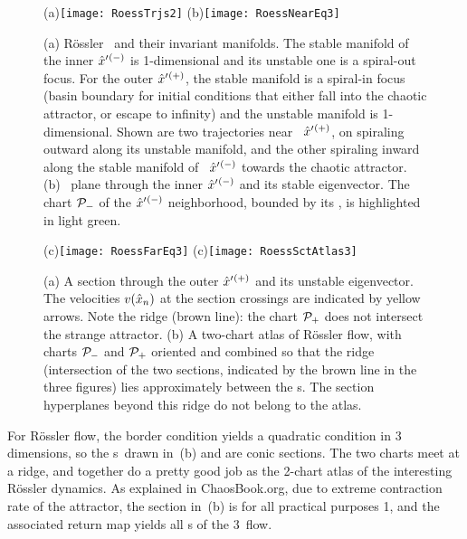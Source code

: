 \documentclass[aip,cha,reprint,
secnumarabic,
nofootinbib, tightenlines,
nobibnotes, showkeys, showpacs,
groupedaddress
]{revtex4-1}
\begin{document}
\begin{figure}
(a)\texttt{[image: RoessTrjs2]}%
(b)\texttt{[image: RoessNearEq3]}
    \caption{
(a)
R\"ossler \eqva\ and their invariant manifolds. The stable manifold of
the inner {\eqv} ${\hat{x}'}{}^{(-)}$  is 1-dimensional and its unstable one
is a spiral-out focus. For the outer {\eqv} ${\hat{x}'}{}^{(+)}$,  the stable
manifold is a spiral-in focus (basin boundary for initial conditions that
either fall into the chaotic attractor, or escape to infinity) and the
unstable manifold is 1-dimensional. Shown are two trajectories near
\eqv\ ${\hat{x}'}{}^{(+)}$, on spiraling outward along its unstable
manifold, and the other spiraling inward along the stable manifold of
\eqv\ ${\hat{x}'}{}^{(-)}$ towards the chaotic attractor.
(b)
\PoincSec\ plane through the inner {\eqv} ${\hat{x}'}{}^{(-)}$ and
its stable eigenvector. The chart ${\cal P}_{-}$ of the ${\hat{x}'}{}^{(-)}$
neighborhood, bounded by its \poincBord, is highlighted in light green.
    }
\label{fig:RoessTrjs}
\end{figure}

\begin{figure}%
\begin{center}
(c)\texttt{[image: RoessFarEq3]}%
(c)\texttt{[image: RoessSctAtlas3]}
\end{center}
  \caption[R\"ossler section, outer {\eqv}]{
(a)
  A section through the outer {\eqv} ${\hat{x}'}{}^{(+)}$  and its unstable
  eigenvector. The velocities $v(\hat{x}_n)$ at the section crossings
  are indicated by yellow arrows. Note the ridge (brown line): the chart
  ${\cal P}_{+}$ does not intersect the strange attractor.
(b)
  A two-chart atlas of R\"ossler flow, with charts ${\cal P}_{-}$ and
  ${\cal P}_{+}$ oriented and combined so that the ridge (intersection of
  the two sections, indicated by the brown line in the three figures)
  lies approximately between the \template s. The section hyperplanes
  beyond this ridge do not belong to the atlas.
  } \label{fig:RoessFarEq}
\end{figure}

For R\"ossler flow, the border condition  yields a
quadratic condition in 3 dimensions, so the \poincBord s\ drawn in
\,(b) and  are conic
sections. The two charts meet at a ridge, and together do a pretty good
job as the 2-chart atlas of the interesting R\"ossler dynamics. As
explained in ChaosBook.org, due to extreme contraction rate of
the attractor, the section in \,(b) is for all practical
purposes 1\dmn, and the associated return map yields all \po s of the 3\dmn\ flow.
\end{document}
